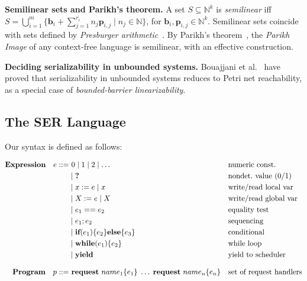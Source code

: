 \medskip
\noindent
\textbf{Semilinear sets and Parikh’s theorem.} 
A set $S\subseteq\mathbb N^k$ is \textit{semilinear} iff  
$S=\bigcup_{i=1}^m \{\mathbf b_i+\sum_{j=1}^{r_i} n_j\mathbf p_{i,j}\mid n_j\in\mathbb N\}$,  
for $\mathbf b_i,\mathbf p_{i,j}\in\mathbb N^k$.  
Semilinear sets coincide with sets defined by \textit{Presburger arithmetic}~\cite{Pr29}.  
By Parikh’s theorem~\cite{Parikh66}, the \textit{Parikh Image} of any context-free language is semilinear, with an effective construction.

\medskip
\noindent
\textbf{Deciding serializability in unbounded systems.} 
Bouajjani et al.~\cite{BoEmEnHa13} have proved that serializability in unbounded systems reduces to Petri net reachability, as a special case of \textit{bounded-barrier linearizability}.


\subsection{The SER Language}
Our \toolname{} syntax is defined as follows: 

\[
\begin{aligned}
	\mathbf{Expression}\quad e ::= &\ 0 \mid 1 \mid 2 \mid \dots            && \text{numeric const.}\\
	&\mid \textbf{?}                            && \text{nondet.\ value (0/1)}\\
	&\mid x := e \mid x                      && \text{write/read local var}\\
	&\mid X := e \mid X                      && \text{write/read global var}\\
	&\mid e_1 == e_2                         && \text{equality test}\\
	&\mid e_1 ; e_2                          && \text{sequencing}\\
	&\mid \textbf{if}(e_1)\{e_2\}\textbf{else}\{e_3\}    && \text{conditional}\\
	&\mid \textbf{while}(e_1)\{e_2\}               && \text{while loop}\\
	&\mid \textbf{yield}                           && \text{yield to scheduler}
	\\[0.8em]
	\mathbf{Program}\quad p ::= &\ \textbf{request}\ name_1\{e_1\}\;\dots\;\textbf{request}\ name_n\{e_n\}
	&& \text{set of request handlers}
\end{aligned}
\]

